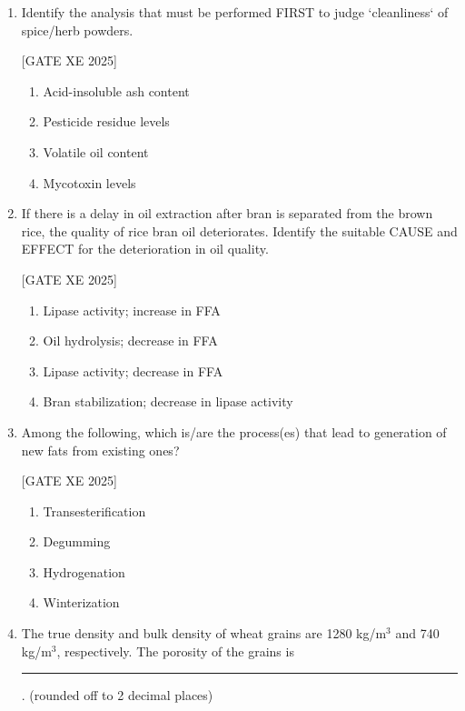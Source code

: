 \documentclass[journal,12pt,onecolumn]{IEEEtran}
\theoremstyle{remark}
\begin{document}
\begin{enumerate}
\item Identify the analysis that must be performed FIRST to judge `cleanliness` of spice/herb powders.

\hfill[GATE XE 2025]

\begin{multicols}{2}
\begin{enumerate}
\item Acid-insoluble ash content
\item Pesticide residue levels
\item Volatile oil content
\item Mycotoxin levels
\end{enumerate}
\end{multicols}

\item If there is a delay in oil extraction after bran is separated from the brown rice, the quality of rice bran oil deteriorates. Identify the suitable CAUSE and EFFECT for the deterioration in oil quality.

\hfill[GATE XE 2025]

\begin{multicols}{2}
\begin{enumerate}
\item Lipase activity; increase in FFA
\item Oil hydrolysis; decrease in FFA
\item Lipase activity; decrease in FFA
\item Bran stabilization; decrease in lipase activity
\end{enumerate}
\end{multicols}

\item Among the following, which is/are the process(es) that lead to generation of new fats from existing ones?

\hfill[GATE XE 2025]

\begin{multicols}{2}
\begin{enumerate}
\item Transesterification
\item Degumming
\item Hydrogenation
\item Winterization
\end{enumerate}
\end{multicols}

\item The true density and bulk density of wheat grains are 1280 kg/m$^3$ and 740 kg/m$^3$, respectively. The porosity of the grains is \rule{3cm}{0.15mm}. (rounded off to 2 decimal places)


\end{enumerate}
\end{document}
